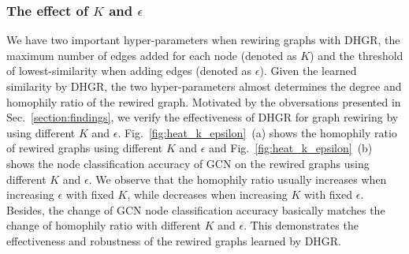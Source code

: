 \documentclass[sigconf]{acmart}
\begin{document}
	\subsubsection{The effect of  $K$ and $\epsilon$}
	We have two important hyper-parameters when rewiring graphs with DHGR, the maximum number of edges added for each node (denoted as  $K$) and the threshold of lowest-similarity when adding edges (denoted as $\epsilon$). Given the learned similarity by DHGR, the two hyper-parameters almost determines the degree and homophily ratio of the rewired graph. Motivated by the obversations presented in Sec.~\ref{section:findings}, we verify the effectiveness of DHGR for graph rewiring by using different $K$ and $\epsilon$. Fig.~\ref{fig:heat_k_epsilon}~(a) shows the homophily ratio of rewired graphs using different $K$ and $\epsilon$ and Fig.~\ref{fig:heat_k_epsilon}~(b) shows the node classification accuracy of GCN on the rewired graphs using different $K$ and $\epsilon$. We observe that the homophily ratio usually increases when increasing $\epsilon$ with fixed $K$, while decreases when increasing $K$ with fixed $\epsilon$. Besides, the change of GCN node classification accuracy basically matches the change of homophily ratio with different $K$ and $\epsilon$. This demonstrates the effectiveness and robustness of the rewired graphs learned by DHGR.
\end{document}
